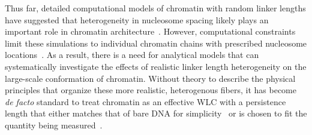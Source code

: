 \documentclass[%
 reprint,
superscriptaddress,
showpacs,preprintnumbers,
 amsmath,amssymb,
 aps,
 prl,
]{revtex4-1}
\begin{document}
Thus far, detailed computational models of chromatin with random
    linker lengths have suggested that heterogeneity in nucleosome spacing likely plays an
    important role in chromatin
    architecture~\cite{woodcock1993,collepardo-guevara2014,bascom2017a}.  %
However, computational constraints limit these simulations to individual
    chromatin chains with prescribed nucleosome
    locations~\cite{collepardo-guevara2014}.
As a result, there is
    a need for analytical models that can systematically
    investigate the effects of realistic linker length heterogeneity on the
    large-scale conformation of chromatin.
Without theory to describe the physical principles that organize these more realistic,
    heterogenous fibers, it has become \textit{de facto} standard to treat
    chromatin as an effective WLC with a persistence length that either matches
    that of bare DNA for
    simplicity~\cite{benedetti2017,macphersonInPress,nuebler2018} or is chosen
    to fit the quantity being measured~\cite{sanborn2015,pierro2017}.
\end{document}
